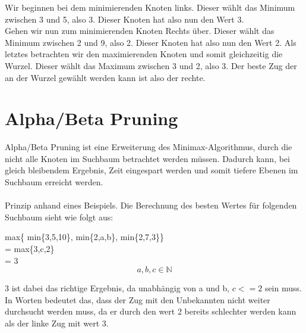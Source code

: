 Wir beginnen bei dem minimierenden Knoten links.
Dieser wählt das Minimum zwischen 3 und 5, also 3.
Dieser Knoten hat also nun den Wert 3.\\
Gehen wir nun zum minimierenden Knoten Rechts über.
Dieser wählt das Minimum zwischen 2 und 9, also 2.
Dieser Knoten hat also nun den Wert 2.
Als letztes betrachten wir den maximierenden Knoten und somit gleichzeitig die Wurzel.
Dieser wählt das Maximum zwischen 3 und 2, also 3.
Der beste Zug der an der Wurzel gewählt werden kann ist also der rechte.

\section{Alpha/Beta Pruning}
Alpha/Beta Pruning ist eine Erweiterung des Minimax-Algorithmus, durch die nicht alle Knoten im Suchbaum betrachtet werden müssen. Dadurch kann, bei gleich bleibendem Ergebnis, Zeit eingespart werden und somit tiefere Ebenen im Suchbaum erreicht werden.
\\\\
Prinzip anhand eines Beispiels.
Die Berechnung des besten Wertes für folgenden Suchbaum sieht wie folgt aus:
\begin{flushleft}
max\{ min\{3,5,10\}, min\{2,a,b\}, min\{2,7,3\}\}\\ = max\{3,c,2\}\\ = 3      $$a,b,c \in \mathbb{N}$$
\end{flushleft}
3 ist dabei das richtige Ergebnis, da unabhängig von a und b, $c<=2$ sein muss. In Worten bedeutet das, dass der Zug mit den Unbekannten nicht weiter durchsucht werden muss, da er durch den wert 2 bereits schlechter werden kann als der linke Zug mit wert 3. 

